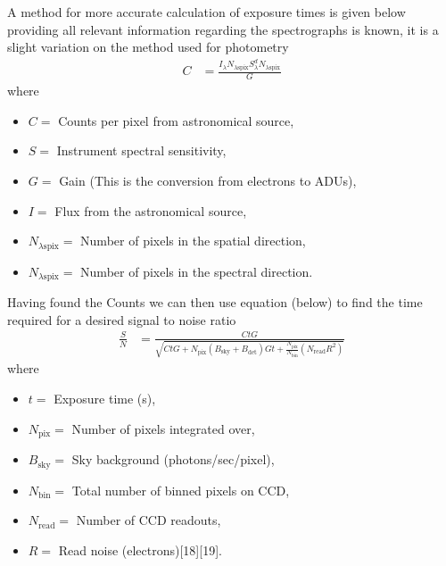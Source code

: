 	A method for more accurate calculation of exposure times is given below providing all relevant information regarding the spectrographs is known, it is a slight variation on the method used for photometry
	\begin{align}
		C &= \frac{I_\lambda N_{\lambda \text{spix}}S_\lambda^d N_{\lambda \text{spix}}}{G}
	\end{align}
	where
	\begin{itemize}
		\item $C =$ Counts per pixel from astronomical source,
		\item $S =$ Instrument spectral sensitivity,
		\item $G =$ Gain (This is the conversion from electrons to ADUs),
		\item $I =$ Flux from the astronomical source,
		\item $N_{\lambda \text{spix}} =$ Number of pixels in the spatial direction,
		\item $N_{\lambda \text{spix}} =$ Number of pixels in the spectral direction.
	\end{itemize}
	Having found the Counts we can then use equation (below) to find the time required for a desired signal to noise ratio
	\begin{align}
		\frac{S}{N} &= \frac{CtG}{\sqrt{CtG + N_\text{pix}(B_\text{sky} + B_\text{det}) Gt + \frac{N_\text{pix}}{N_\text{bin}}(N_\text{read} R^2)}}
	\end{align}
	where
	\begin{itemize}
		\item $t =$ Exposure time (s),
		\item $N_\text{pix} =$ Number of pixels integrated over,
		\item $B_\text{sky} =$ Sky background (photons/sec/pixel),
		\item $N_\text{bin} =$ Total number of binned pixels on CCD,
		\item $N_\text{read} =$ Number of CCD readouts,
		\item $R =$ Read noise (electrons)\cite{}[18]\cite{}[19].
	\end{itemize}
